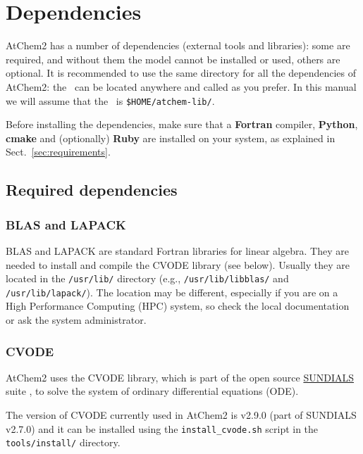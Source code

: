 \section{Dependencies} \label{sec:dependencies}

AtChem2 has a number of dependencies (external tools and libraries):
some are required, and without them the model cannot be installed or
used, others are optional. It is recommended to use the same directory
for all the dependencies of AtChem2: the \depdir\ can be located
anywhere and called as you prefer. In this manual we will assume that
the \depdir\ is \texttt{\$HOME/atchem-lib/}.

Before installing the dependencies, make sure that a \textbf{Fortran}
compiler, \textbf{Python}, \textbf{cmake} and (optionally)
\textbf{Ruby} are installed on your system, as explained in
Sect.~\ref{sec:requirements}.

\subsection{Required dependencies} \label{subsec:required-dependencies}

\subsubsection{BLAS and LAPACK}

BLAS and LAPACK are standard Fortran libraries for linear
algebra. They are needed to install and compile the CVODE library (see
below). Usually they are located in the \texttt{/usr/lib/} directory
(e.g., \texttt{/usr/lib/libblas/} and \texttt{/usr/lib/lapack/}). The
location may be different, especially if you are on a High Performance
Computing (HPC) system, so check the local documentation or ask the
system administrator.

\subsubsection{CVODE}

AtChem2 uses the CVODE library, which is part of the open source
\href{https://computation.llnl.gov/projects/sundials}{SUNDIALS} suite
\citep{hindmarsh_2005}, to solve the system of ordinary
differential equations (ODE).

The version of CVODE currently used in AtChem2 is v2.9.0 (part of
SUNDIALS v2.7.0) and it can be installed using the
\texttt{install\_cvode.sh} script in the \texttt{tools/install/}
directory.

